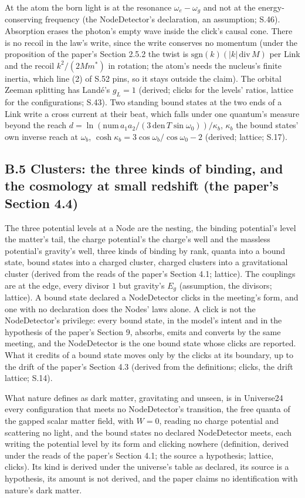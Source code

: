 \documentclass[pdflatex,sn-mathphys-num]{sn-jnl}
\newcommand{\num}{\mathrm{num}}
\newcommand{\den}{\mathrm{den}}
\theoremstyle{thmstyleone}
\begin{document}
At the atom the born light is at the resonance $\omega_e - \omega_g$ and not at the energy-conserving frequency (the NodeDetector's declaration, an assumption; S.46). Absorption erases the photon's empty wave inside the click's causal cone. There is no recoil in the law's write, since the write conserves no momentum (under the proposition of the paper's Section 2.5.2 the twist is $\mathrm{sgn}(k)(|k|\,\mathrm{div}\,M)$ per Link and the recoil $k^2 / (2Mm^*)$ in rotation; the atom's needs the nucleus's finite inertia, which line (2) of S.52 pins, so it stays outside the claim). The orbital Zeeman splitting has Land\'e's $g_L = 1$ (derived; clicks for the levels' ratios, lattice for the configurations; S.43). Two standing bound states at the two ends of a Link write a cross current at their beat, which falls under one quantum's measure beyond the reach $d = \ln(\num\,a_1 a_2 / (3\,\den\,T\sin\omega_0)) / \kappa_b$, $\kappa_b$ the bound states' own inverse reach at $\omega_b$, $\cosh\kappa_b = 3\cos\omega_b / \cos\omega_0 - 2$ (derived; lattice; S.17).

\subsection*{B.5 Clusters: the three kinds of binding, and the cosmology at small redshift (the paper's Section 4.4)}

The three potential levels at a Node are the nesting, the binding potential's level the matter's tail, the charge potential's the charge's well and the massless potential's gravity's well, three kinds of binding by rank, quanta into a bound state, bound states into a charged cluster, charged clusters into a gravitational cluster (derived from the reads of the paper's Section 4.1; lattice). The couplings are at the edge, every divisor $1$ but gravity's $E_g$ (assumption, the divisors; lattice). A bound state declared a NodeDetector clicks in the meeting's form, and one with no declaration does the Nodes' laws alone. A click is not the NodeDetector's privilege: every bound state, in the model's intent and in the hypothesis of the paper's Section 9, absorbs, emits and converts by the same meeting, and the NodeDetector is the one bound state whose clicks are reported. What it credits of a bound state moves only by the clicks at its boundary, up to the drift of the paper's Section 4.3 (derived from the definitions; clicks, the drift lattice; S.14).

What nature defines as dark matter, gravitating and unseen, is in Universe24 every configuration that meets no NodeDetector's transition, the free quanta of the gapped scalar matter field, with $W = 0$, reading no charge potential and scattering no light, and the bound states no declared NodeDetector meets, each writing the potential level by its form and clicking nowhere (definition, derived under the reads of the paper's Section 4.1; the source a hypothesis; lattice, clicks). Its kind is derived under the universe's table as declared, its source is a hypothesis, its amount is not derived, and the paper claims no identification with nature's dark matter.
\end{document}
